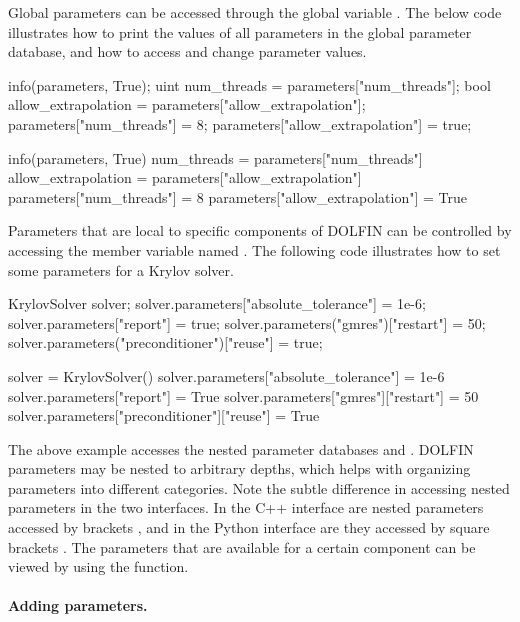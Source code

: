 Global parameters can be accessed through the global variable
. The below code illustrates how to print the values of
all parameters in the global parameter database, and how to access and
change parameter values.
\begin{c++}
info(parameters, True);
uint num_threads = parameters["num_threads"];
bool allow_extrapolation = parameters["allow_extrapolation"];
parameters["num_threads"] = 8;
parameters["allow_extrapolation"] = true;
\end{c++}
\begin{python}
info(parameters, True)
num_threads = parameters["num_threads"]
allow_extrapolation = parameters["allow_extrapolation"]
parameters["num_threads"] = 8
parameters["allow_extrapolation"] = True
\end{python}
Parameters that are local to specific components of DOLFIN can be
controlled by accessing the member variable named . The
following code illustrates how to set some parameters for a Krylov solver.
\begin{c++}
KrylovSolver solver;
solver.parameters["absolute_tolerance"] = 1e-6;
solver.parameters["report"] = true;
solver.parameters("gmres")["restart"] = 50;
solver.parameters("preconditioner")["reuse"] = true;
\end{c++}
\begin{python}
solver = KrylovSolver()
solver.parameters["absolute_tolerance"] = 1e-6
solver.parameters["report"] = True
solver.parameters["gmres"]["restart"] = 50
solver.parameters["preconditioner"]["reuse"] = True
\end{python}
The above example accesses the nested parameter databases 
and . DOLFIN parameters may be nested to
arbitrary depths, which helps with organizing parameters into different
categories. Note the subtle difference in accessing nested parameters in
the two interfaces. In the C++ interface are nested parameters accessed
by brackets , and in the Python interface are they accessed
by square brackets \emp{["..."]}. The parameters that are available for
a certain component can be viewed by using the  function.


\paragraph{Adding parameters.}

